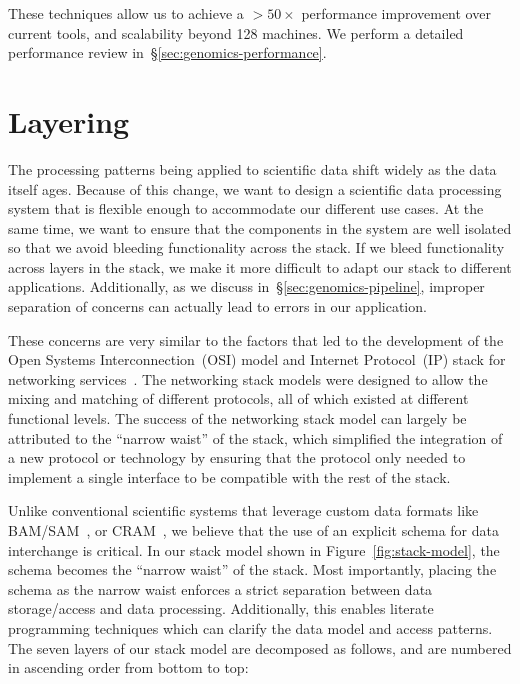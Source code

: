 \documentclass[masters]{ucbthesis}
\begin{document}
These techniques allow us to achieve a $>50\times$ performance improvement over current tools, and
scalability beyond 128 machines. We perform a detailed performance review
in~\S\ref{sec:genomics-performance}.

\section{Layering}
\label{sec:layering}

The processing patterns being applied to scientific data shift widely as the data itself ages. Because of
this change, we want to design a scientific data processing system that is flexible enough to
accommodate our different use cases. At the same time, we want to ensure that the components in the
system are well isolated so that we avoid bleeding functionality across the stack. If we bleed functionality
across layers in the stack, we make it more difficult to adapt our stack to different applications.
Additionally, as we discuss in~\S\ref{sec:genomics-pipeline}, improper separation of concerns can
actually lead to errors in our application.

These concerns are very similar to the factors that led to the development of the Open Systems
Interconnection~(OSI) model and Internet Protocol~(IP) stack for networking
services~\cite{zimmermann80}. The networking stack models were designed to allow the mixing and
matching of different protocols, all of which existed at different functional levels. The success of the
networking stack model can largely be attributed to the ``narrow waist'' of the stack, which simplified the
integration of a new protocol or technology by ensuring that the protocol only needed to implement a
single interface to be compatible with the rest of the stack.

Unlike conventional scientific systems that leverage custom data formats like BAM/SAM~\cite{li09},
or CRAM~\cite{fritz11}, we believe that the use of an explicit schema for data interchange is critical.
In our stack model shown in Figure~\ref{fig:stack-model}, the schema becomes the ``narrow waist''
of the stack. Most importantly, placing the schema as the narrow waist enforces a strict separation
between data storage/access and data processing. Additionally, this enables literate programming
techniques which can clarify the data model and access patterns. The seven layers of our stack model
are decomposed as follows, and are numbered in ascending order from bottom to top:
\end{document}
